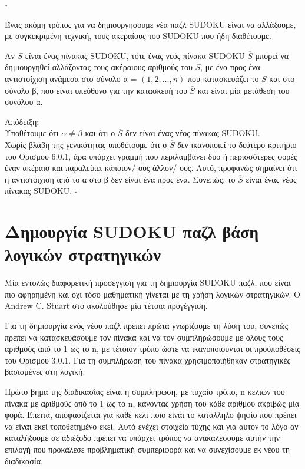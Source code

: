\documentclass[12pt]{book}
\theoremstyle{definition}
\begin{document}
\(\square\)

Ένας ακόμη τρόπος για να δημιουργησουμε νέα παζλ SUDOKU είναι να αλλάξουμε, με συγκεκριμένη τεχνική, τους ακεραίους του SUDOKU που ήδη διαθέτουμε. \par 

\begin{theorem}{}{}
	Αν \(S\) είναι ένας πίνακας SUDOKU, τότε ένας νεός πίνακα SUDOKU \(\overline{S}\) μπορεί να δημιουργηθεί αλλάζοντας τους ακέραιους αριθμούς του \(S\), με ένα προς ένα αντιστοίχιση ανάμεσα στο σύνολο α = \(\left( 1,2,\dots,n\right)\) που κατασκευάζει το \(S\) και στο σύνολο β, που είναι υπεύθυνο για την κατασκευή του \(\overline{S}\) και είναι μία μετάθεση του συνόλου α.
\end{theorem}

Απόδειξη: \\
Υποθέτουμε ότι \(α \neq β\) και ότι ο \(\overline{S}\) δεν είναι ένας νέος πίνακας SUDOKU. \\

Χωρίς βλάβη της γενικότητας υποθέτουμε ότι ο \(\overline{S}\) δεν ικανοποιεί το δεύτερο κριτήριο του Ορισμού 6.0.1, άρα υπάρχει γραμμή που περιλαμβάνει δύο ή περισσότερες φορές έναν ακέραιο και παραλείπει κάποιον/-ους άλλον/-ους. Αυτό, προφανώς σημαίνει ότι η αντιστόιχιση από το α στο β δεν είναι ένα προς ένα. Συνεπώς, το \(\overline{S}\) είναι ένας νέος πίνακας SUDOKU. \(\square\)

\section{Δημουργία SUDOKU παζλ βάση λογικών στρατηγικών}

Μία εντολώς διαφορετική προσέγγιση για τη δημιουργία SUDOKU παζλ, που είναι πιο αφηρημένη και όχι τόσο μαθηματική γίνεται με τη χρήση λογικών στρατηγικών. Ο Andrew C. Stuart στο \cite{9} ακολούθησε μία τέτοια προγέγγιση. \par

Για τη δημιουργία ενός νέου παζλ πρέπει πρώτα γνωρίζουμε τη λύση του, συνεπώς πρέπει να κατασκευάσουμε τον πίνακα και να τον συμπληρώσουμε με όλους τους αριθμούς από το 1 ως το n, με τέτοιον τρόπο ώστε να ικανοποιούνται οι προϋποθέσεις του Ορισμού 3.0.1. Για τη συμπλήρωση του πίνακα χρησιμοποιήθηκαν στρατηγικές βασισμένες στη λογική. \par

Πρώτο βήμα της διαδικασίας είναι η συμπλήρωση, με τυχαίο τρόπο, n κελιών του πίνακα με αριθμούς από το 1 ως το n, κάνοντας χρήση του κάθε αριθμού ακριβώς μία φορά. Έπειτα, αποφασίζεται για κάθε κελί ποιο είναι το κατάλληλο ψηφίο που πρέπει να είναι εκεί τοποθετημένο εκεί. Αυτό ενέχει στοιχεία τύχης και για αυτόν το λόγο αν καταλήξουμε σε αδιέξοδο πρέπει να υπάρχει τρόπος να ανακαλέσουμε αυτήν την επιλογή που προκάλεσε προβληματική συμπεριφορά και να συνεχίσουμε εκ νέου τη διαδικασία. \par
\end{document}

